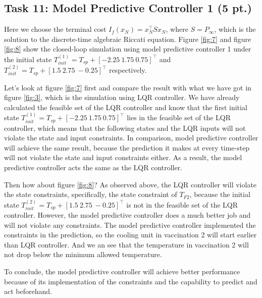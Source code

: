 \documentclass[a4paper,twoside,11pt]{article}
\numberwithin{equation}{section}
\begin{document}
\subsection{Task 11: Model Predictive Controller 1 (5 pt.)}

Here we choose the terminal cost $I_f(x_N) = x_N^\top S x_N$, where $S = P_\infty$, which is the solution to the discrete-time algebraic Riccati equation. Figure \ref{fig:7} and figure \ref{fig:8} show the closed-loop simulation using model predictive controller 1 under the initial state $T^{(1)}_{init} = T_{sp} + [-2.25 \ 1.75 \ 0.75]^\top$ and $T^{(2)}_{init} = T_{sp} + [1.5 \ 2.75 \ -0.25]^\top$ respectively. 

Let's look at figure \ref{fig:7} first and compare the result with what we have got in figure \ref{fig:3}, which is the simulation using LQR controller. We have already calculated the feasible set of the LQR controller and know that the first initial state $T^{(1)}_{init} = T_{sp} + [-2.25 \ 1.75 \ 0.75]^\top$ lies in the feasible set of the LQR controller, which means that the following states and the LQR inputs will not violate the state and input constraints. In comparison, model predictive controller will achieve the same result, because the prediction it makes at every time-step will not violate the state and input constraints either. As a result, the model predictive controller acts the same as the LQR controller. 

Then how about figure \ref{fig:8}? As observed above, the LQR controller will violate the state constraints, specifically, the state constraint of $T_{F2}$, because the initial state $T^{(2)}_{init} = T_{sp} + [1.5 \ 2.75 \ -0.25]^\top$ is not in the feasible set of the LQR controller. However, the model predictive controller does a much better job and will not violate any constraints. The model predictive controller implemented the constraints in the prediction, so the cooling unit in vaccination 2 will start earlier than LQR controller. And we an see that the temperature in vaccination 2 will not drop below the minimum allowed temperature. 

To conclude, the model predictive controller will achieve better performance because of its implementation of the constraints and the capability to predict and act beforehand. 
\end{document}
